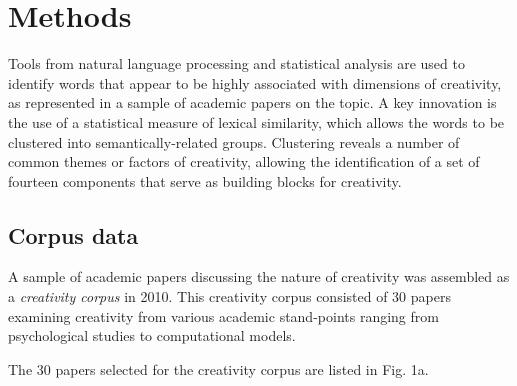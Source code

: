 \documentclass[10pt,letterpaper]{article}
\begin{document}
\section*{Methods}
\label{methodology}

 Tools from natural language processing and statistical analysis are used to identify words that appear to be highly associated with dimensions of creativity, as represented in a sample of academic papers on the topic. A key innovation is the use of a statistical measure of lexical similarity, which allows the words to be clustered into semantically-related groups. Clustering reveals a number of common themes or factors of creativity, allowing the identification of a set of fourteen components that serve as building blocks for creativity.

\subsection*{Corpus data}\label{corpusData}

A sample of academic papers discussing the nature of creativity was assembled as a {\em creativity corpus\/} in 2010. This creativity corpus consisted of 30 papers examining creativity from various academic stand-points ranging from psychological studies to computational models. 

\vspace{0.25cm}
\begin{center}
\end{center}
\vspace{0.25cm}

The 30 papers selected for the creativity corpus are listed in Fig. 1a. %

\end{document}
